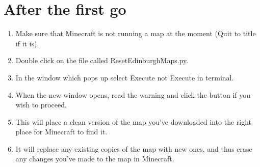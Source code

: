 \documentclass{geocraft-worksheet-multipage}
\begin{document}
\section*{After the first go}
\begin{enumerate}
\item Make sure that Minecraft is not running a map at the moment
  (Quit to title if it is).
\item Double click on the file called ResetEdinburghMaps.py.
\item In the window which pops up select Execute not Execute in terminal.
\item When the new window opens, read the warning and click the button
  if you wish to proceed.
\item This will place a clean version of the map you've downloaded
  into the right place for Minecraft to find it. 
\item It will replace any existing copies of the map with new ones,
  and thus erase any changes you've made to the map in Minecraft.
\end{enumerate}
\end{document}
